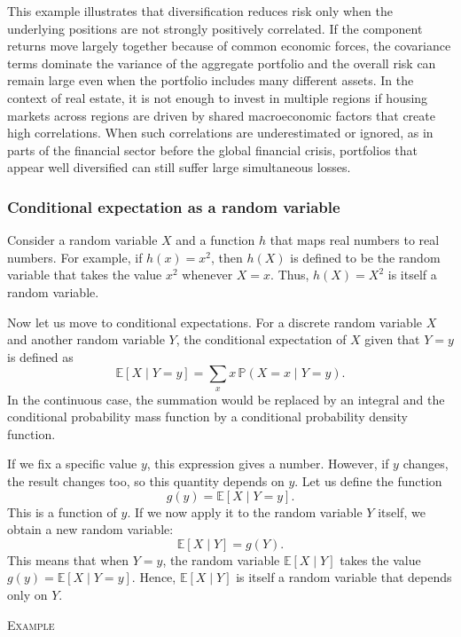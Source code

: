 This example illustrates that diversification reduces risk only when the underlying positions are not strongly positively correlated.  
If the component returns move largely together because of common economic forces, the covariance terms dominate the variance of the aggregate portfolio and the overall risk can remain large even when the portfolio includes many different assets.  
In the context of real estate, it is not enough to invest in multiple regions if housing markets across regions are driven by shared macroeconomic factors that create high correlations.  
When such correlations are underestimated or ignored, as in parts of the financial sector before the global financial crisis, portfolios that appear well diversified can still suffer large simultaneous losses.



\subsubsection{Conditional expectation as a random variable}

Consider a random variable \( X \) and a function \( h \) that maps real numbers to real numbers.  
For example, if \( h(x) = x^2 \), then \( h(X) \) is defined to be the random variable that takes the value \( x^2 \) whenever \( X = x \).  
Thus, \( h(X) = X^2 \) is itself a random variable.

Now let us move to conditional expectations.  
For a discrete random variable \( X \) and another random variable \( Y \), the conditional expectation of \( X \) given that \( Y = y \) is defined as
\[
\mathbb{E}[X \mid Y = y]
=
\sum_{x} x\,\mathbb{P}(X = x \mid Y = y).
\]
In the continuous case, the summation would be replaced by an integral and the conditional probability mass function by a conditional probability density function.

If we fix a specific value \( y \), this expression gives a number.  
However, if \( y \) changes, the result changes too, so this quantity depends on \( y \).  
Let us define the function
\[
g(y) = \mathbb{E}[X \mid Y = y].
\]
This is a function of \( y \).  
If we now apply it to the random variable \( Y \) itself, we obtain a new random variable:
\[
\mathbb{E}[X \mid Y] = g(Y).
\]
This means that when \( Y = y \), the random variable \( \mathbb{E}[X \mid Y] \) takes the value \( g(y) = \mathbb{E}[X \mid Y = y] \).  
Hence, \( \mathbb{E}[X \mid Y] \) is itself a random variable that depends only on \( Y \).

\bigskip
\textsc{Example}

